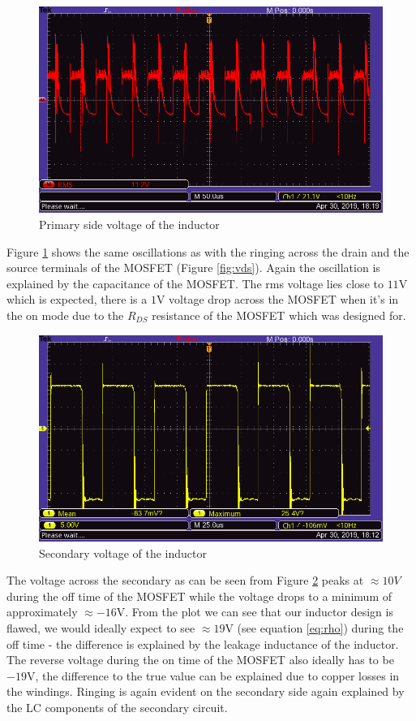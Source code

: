 \documentclass[a4paper, 12pt]{article}
\begin{document}
\begin{figure}[H]
  \centering
  \includegraphics[width=\textwidth]{images/Primary.png}
  \caption{Primary side voltage of the inductor}
  \label{fig:primary}
\end{figure} 

Figure \ref{fig:primary} shows the same oscillations as with the ringing across the drain and the source terminals of the MOSFET (Figure \ref{fig:vds}). Again the oscillation is explained by the capacitance of the MOSFET. The rms voltage lies close to $11$V which is expected, there is a $1$V voltage drop across the MOSFET when it's in the on mode due to the $R_{DS}$ resistance of the MOSFET which was designed for.  


\begin{figure}[H]
  \centering
  \includegraphics[width=\textwidth]{images/Secondary.png}
  \caption{Secondary voltage of the inductor}
  \label{fig:secondary}
\end{figure} 

The voltage across the secondary as can be seen from Figure \ref{fig:secondary} peaks at $\approx 10V$ during the off time of the MOSFET while the voltage drops to a minimum of approximately $\approx -16$V. From the plot we can see that our inductor design is flawed, we would ideally expect to see $\approx 19$V (see equation \eqref{eq:rho}) during the off time - the difference is explained by the leakage inductance of the inductor. The reverse voltage during the on time of the MOSFET also ideally has to be $-19$V, the difference to the true value can be explained due to copper losses in the windings.  Ringing is again evident on the secondary side again explained by the LC components of the secondary circuit.
\end{document}
